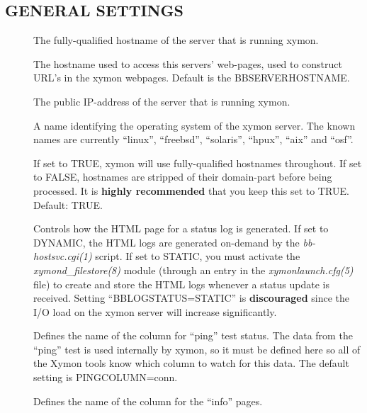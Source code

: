 \subsection{GENERAL SETTINGS}


\begin{description}

\item[] The fully-qualified hostname of the server that is running xymon. 

\item[] The hostname used to access this servers'
  web-pages, used to construct URL's in the xymon webpages. Default
  is the BBSERVERHOSTNAME. 


\item[] The public IP-address of the server that is running xymon. 
 

\item[] A name identifying the operating system of the
  xymon server. The known names are currently ``linux'', ``freebsd'',
  ``solaris'', ``hpux'', ``aix'' and ``osf''. 

\item[] If set to TRUE, xymon will use fully-qualified hostnames
  throughout. If set to FALSE, hostnames are stripped of their
  domain-part before being processed. It is \textbf{highly
  recommended} that you keep this set to TRUE. Default: TRUE. 

\item[] Controls how the HTML page for a status log is
  generated. If set to DYNAMIC, the HTML logs are generated on-demand
  by the \emph{bb-hostsvc.cgi(1)} script. If set to STATIC, you must
  activate the \emph{xymond\_filestore(8)} module (through an entry
  in the \emph{xymonlaunch.cfg(5)} file) to create and store the HTML
  logs whenever a status update is received. Setting
  ``BBLOGSTATUS=STATIC'' is \textbf{discouraged} since the I/O load on
  the xymon server will increase significantly. 


\item[] Defines the name of the column for ``ping'' test
  status. The data from the ``ping'' test is used internally by
  xymon, so it must be defined here so all of the Xymon tools know
  which column to watch for this data. The default setting is
  PINGCOLUMN=conn. 

\item[] Defines the name of the column for the ``info'' pages. 


\end{description}
